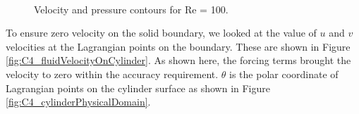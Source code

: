 \begin{figure}[H]
    \centering
    \quad
    \\
    \caption{Velocity and pressure contours for Re = 100.}
    \label{fig:C4_contourPlotsForFlowOverCylidnerGE}
\end{figure}
%
To ensure zero velocity on the solid boundary, we looked at the value of $u$ and $v$ velocities at the Lagrangian points on the boundary. These are shown in Figure \ref{fig:C4_fluidVelocityOnCylinder}. As shown here, the forcing terms brought the velocity to zero within the accuracy requirement. $\theta$ is the polar coordinate of Lagrangian points on the cylinder surface as shown in Figure \ref{fig:C4_cylinderPhysicalDomain}.
%
